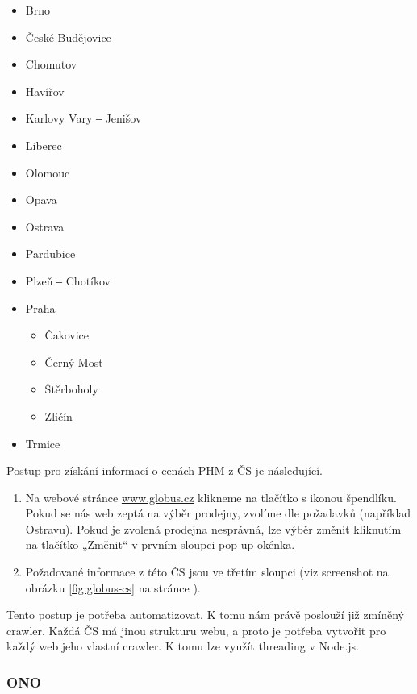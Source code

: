 \begin{itemize}
    \item Brno
    \item České Budějovice
    \item Chomutov
    \item Havířov
    \item Karlovy Vary ‒ Jenišov
    \item Liberec
    \item Olomouc
    \item Opava
    \item Ostrava
    \item Pardubice
    \item Plzeň ‒ Chotíkov
    \item Praha
    \begin{itemize}
        \item Čakovice
        \item Černý Most
        \item Štěrboholy
        \item Zličín
    \end{itemize}
    \item Trmice
\end{itemize}

Postup pro získání informací o cenách PHM z ČS je následující.

\begin{enumerate}
    \item Na webové stránce \url{www.globus.cz} klikneme na tlačítko s ikonou
        špendlíku. Pokud se nás web zeptá na výběr prodejny, zvolíme
        dle požadavků (například Ostravu). Pokud je zvolená prodejna
        nesprávná, lze výběr změnit kliknutím na tlačítko „Změnit“
        v prvním sloupci pop-up okénka.
    \item Požadované informace z této ČS jsou ve třetím sloupci (viz
        screenshot na obrázku \ref{fig:globus-cs} na stránce
        \pageref{fig:globus-cs}).
\end{enumerate}

Tento postup je potřeba automatizovat. K tomu nám právě poslouží již
zmíněný crawler. Každá ČS má jinou strukturu webu, a proto je potřeba
vytvořit pro každý web jeho vlastní crawler. K tomu lze využít threading
v Node.js.

\subsubsection{ONO}
\label{sec:preps-ono}

